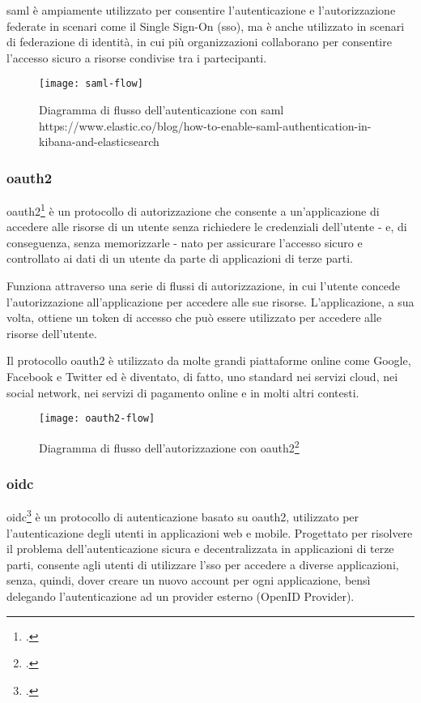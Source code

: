 \acrshort{saml} è ampiamente utilizzato per consentire l'autenticazione e l'autorizzazione federate in scenari come il Single Sign-On (\acrshort{sso}), ma è anche utilizzato in scenari di federazione di identità, in cui più organizzazioni collaborano per consentire l'accesso sicuro a risorse condivise tra i partecipanti.

\begin{figure}[!h] 
    \centering 
    \texttt{[image: saml-flow]} 
    \caption{Diagramma di flusso dell'autenticazione con \acrshort{saml}
    https://www.elastic.co/blog/how-to-enable-saml-authentication-in-kibana-and-elasticsearch}
\end{figure}

\subsubsection{\acrlong{oauth2}}
\acrshort{oauth2}\footcite{site:what-is-oauth} è un protocollo di autorizzazione che consente a un'applicazione di accedere alle risorse di un utente senza richiedere le credenziali dell'utente - e, di conseguenza, senza memorizzarle - nato per assicurare l'accesso sicuro e controllato ai dati di un utente da parte di applicazioni di terze parti.

Funziona attraverso una serie di flussi di autorizzazione, in cui l'utente concede l'autorizzazione all'applicazione per accedere alle sue risorse. L'applicazione, a sua volta, ottiene un token di accesso che può essere utilizzato per accedere alle risorse dell'utente.

Il protocollo \acrshort{oauth2} è utilizzato da molte grandi piattaforme online come Google, Facebook e Twitter ed è diventato, di fatto, uno standard nei servizi cloud, nei social network, nei servizi di pagamento online e in molti altri contesti.

\begin{figure}[!h] 
    \centering 
    \texttt{[image: oauth2-flow]} 
    \caption{Diagramma di flusso dell'autorizzazione con \acrshort{oauth2}\footcite{site:oauth-flow-img}}
\end{figure}
\subsubsection{\acrlong{oidc}}
\acrshort{oidc}\footcite{site:oidc} è un protocollo di autenticazione basato su \acrshort{oauth2}, utilizzato per l'autenticazione degli utenti in applicazioni web e mobile. Progettato per risolvere il problema dell'autenticazione sicura e decentralizzata in applicazioni di terze parti, consente agli utenti di utilizzare l'\acrshort{sso} per accedere a diverse applicazioni, senza, quindi, dover creare un nuovo account per ogni applicazione, bensì delegando l'autenticazione ad un provider esterno (OpenID Provider).


